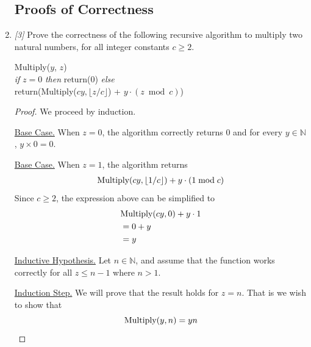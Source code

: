 \documentclass[10pt, letterpaper]{article}
\numberwithin{equation}{section}
\begin{document}
\begin{enumerate}
        \subsection*{Proofs of Correctness}

        \item \textit{[3]} Prove the correctness of the following recursive algorithm to multiply
        two natural numbers, for all integer constants $c \geq 2$.
        \begin{flushleft}
            \hspace{2em} Multiply($y$, $z$) \\
            \hspace{4em} \textit{if} $z = 0$ \textit{then} return($0$) \textit{else} \\
            \hspace{4em} return(Multiply($cy, \lfloor z / c \rfloor$) + $y \cdot (z \bmod c)$)
        \end{flushleft}

        \begin{proof}
            We proceed by induction.

            \underline{Base Case.} When $z = 0$, the algorithm correctly returns $0$ and for every
            $y \in \mathbb{N}$, $y \times 0 = 0$.

            \underline{Base Case.} When $z = 1$, the algorithm returns
            \begin{gather*}
                \textnormal{Multiply}(cy, \lfloor 1 / c \rfloor) + y \cdot (1 \bmod c)
            \end{gather*}
            Since $c \geq 2$, the expression above can be simplified to
            \begin{align*}
                & \textnormal{Multiply}(cy, 0) + y \cdot 1 \\
                & = 0 + y \\
                & = y
            \end{align*}

            \underline{Inductive Hypothesis.} Let $n \in \mathbb{N}$, and assume that the function
            works correctly for all $z \leq n - 1$ where $n > 1$.

            \underline{Induction Step.} We will prove that the result holds for $z = n$. That is we
            wish to show that
            \begin{equation*}
                \textnormal{Multiply}(y, n) = yn
            \end{equation*}


\end{proof}
\end{enumerate}
\end{document}
